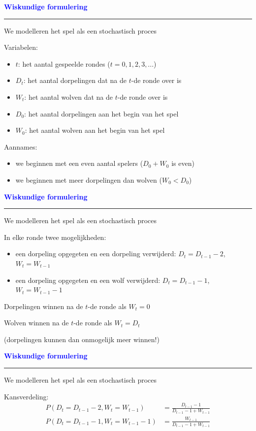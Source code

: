\documentclass{beamer}
\def\gemph#1{{\color{mygreen}#1}}
\def\lbt{} %
\newenvironment{dia}[2]
{
	\begin{frame}
	\vspace{1mm}
	{\small #1}
	\hfill
    {\small\bf\textcolor{blue}{#2}}
	\vspace{3mm}
	\hrule
	\bigskip
}
{
	\vfill
	\end{frame}
}
\begin{document}
\begin{dia}{\lbt}{Wiskundige formulering}
We modelleren het spel als een \gemph{stochastisch proces} \pause \bigskip

Variabelen:
\begin{itemize}
    \item $t$: het aantal gespeelde rondes ($t = 0, 1, 2, 3, ...$) \pause
    \item $D_t$: het aantal dorpelingen dat na de $t$-de ronde over is \pause
    \item $W_t$: het aantal wolven dat na de $t$-de ronde over is \pause
    \item $D_0$: het aantal dorpelingen aan het begin van het spel \pause
    \item $W_0$: het aantal wolven aan het begin van het spel \pause
\end{itemize} \smallskip

Aannames:
\begin{itemize}
    \item we beginnen met een even aantal spelers ($D_0 + W_0$ is even) \pause
    \item we beginnen met meer dorpelingen dan wolven ($W_0 < D_0$)
\end{itemize}
\end{dia}

\begin{dia}{\lbt}{Wiskundige formulering}
We modelleren het spel als een \gemph{stochastisch proces} \bigskip

In elke ronde twee mogelijkheden: \pause
\begin{itemize}
    \item een dorpeling opgegeten en een dorpeling verwijderd: $D_t = D_{t-1} - 2$, $W_t = W_{t-1}$ \pause
    \item een dorpeling opgegeten en een wolf verwijderd: $D_t = D_{t-1} - 1$, $W_t = W_{t-1} - 1$
\end{itemize} \pause \bigskip

Dorpelingen winnen na de $t$-de ronde als $W_t = 0$ \pause \bigskip

Wolven winnen na de $t$-de ronde als $W_t = D_t$ \smallskip

(dorpelingen kunnen dan onmogelijk meer winnen!)
\end{dia}

\begin{dia}{\lbt}{Wiskundige formulering}
We modelleren het spel als een \gemph{stochastisch proces} \bigskip \bigskip

Kansverdeling:
\begin{align*}
    P(D_t = D_{t-1} - 2, W_t = W_{t-1}) &= \frac{D_{t-1} - 1}{D_{t-1} - 1 + W_{t-1}} \\[4mm]
    P(D_t = D_{t-1} - 1, W_t = W_{t-1} - 1) &= \frac{W_{t-1}}{D_{t-1} - 1 + W_{t-1}}
\end{align*}

\vspace{1cm}
\end{dia}
\end{document}
